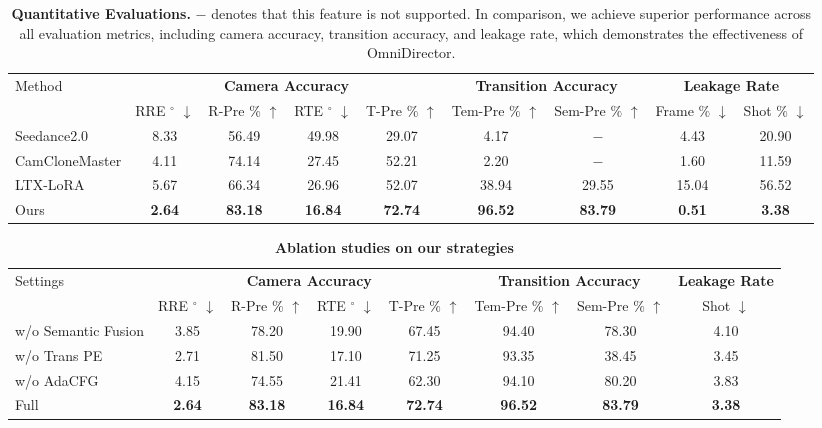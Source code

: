 \documentclass[letterpaper]{article} %
\begin{document}
\begin{table}[t]
\centering
\begin{tabular}{l|c|c|c|c|c|c|c|c}
    \toprule
    \multirow{2}{*}{Method} & \multicolumn{4}{c|}{\textbf{Camera Accuracy}} & \multicolumn{2}{c|}{\textbf{Transition Accuracy}} & \multicolumn{2}{c}{\textbf{Leakage Rate}} \\
    \cline{2-9}
    & RRE $^{\circ}$ $\downarrow$ & R-Pre $\%$ $\uparrow$ & RTE $^{\circ}$ $\downarrow$ & T-Pre $\%$ $\uparrow$ & Tem-Pre $\%$ $\uparrow$ & Sem-Pre $\%$ $\uparrow$ & Frame $\%$ $\downarrow$ & Shot $\%$ $\downarrow$ \\
    \midrule
    Seedance2.0 & 8.33 & 56.49 &49.98 & 29.07 & 4.17 & $-$ & 4.43&20.90 \\
    CamCloneMaster & 4.11 & 74.14 &27.45 & 52.21 & 2.20 & $-$ &1.60&11.59\\
    LTX-LoRA &5.67 & 66.34 & 26.96 & 52.07 & 38.94 & 29.55&15.04&56.52\\
    Ours &\textbf{2.64} & \textbf{83.18} & \textbf{16.84} & \textbf{72.74} & \textbf{96.52} & \textbf{83.79}&\textbf{0.51}&\textbf{3.38}\\
    \bottomrule
\end{tabular}
\caption{\textbf{Quantitative Evaluations.} $-$ denotes that this feature is not supported. In comparison, we achieve superior performance across all evaluation metrics, including camera accuracy, transition accuracy, and leakage rate, which demonstrates the effectiveness of OmniDirector. }
\label{pose_comparison}
\end{table}

\begin{table}
\centering
\begin{tabular}{l|c|c|c|c|c|c|c}
    \toprule
    \multirow{2}{*}{Settings} & \multicolumn{4}{c|}{\textbf{Camera Accuracy}} & \multicolumn{2}{c|}{\textbf{Transition Accuracy}} & \textbf{Leakage Rate} \\
    \cline{2-8}
    & RRE $^{\circ}$ $\downarrow$ & R-Pre $\%$ $\uparrow$ & RTE $^{\circ}$ $\downarrow$ & T-Pre $\%$ $\uparrow$ & Tem-Pre $\%$ $\uparrow$ & Sem-Pre $\%$ $\uparrow$ & Shot $\downarrow$\\
    \midrule
    w/o Semantic Fusion& 3.85&78.20&19.90&67.45&94.40&78.30&4.10\\
    w/o Trans PE& 2.71&81.50&17.10&71.25&93.35&38.45&3.45\\
    w/o AdaCFG & 4.15& 74.55&21.41&62.30&94.10&80.20&3.83\\
    Full &\textbf{2.64} & \textbf{83.18} & \textbf{16.84} & \textbf{72.74} & \textbf{96.52} & \textbf{83.79}&\textbf{3.38}\\
    \bottomrule
\end{tabular}
\caption{\textbf{Ablation studies on our strategies} }
\vspace{-0.5cm}
\label{tab:ablation}
\end{table}
\end{document}
